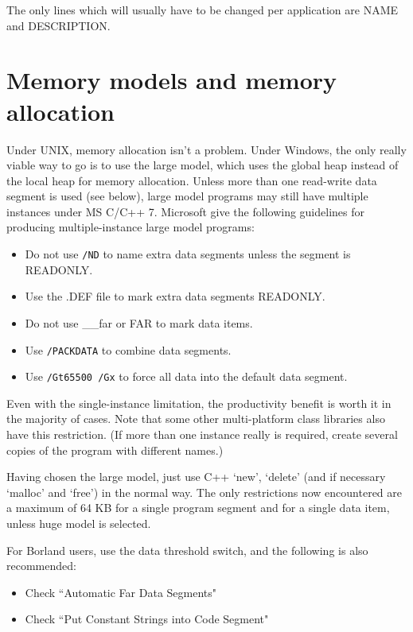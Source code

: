 The only lines which will usually have to be changed per application are
NAME and DESCRIPTION.

\section{Memory models and memory allocation}\label{memorymodels}

Under UNIX, memory allocation isn't a problem. Under Windows, the only
really viable way to go is to use the large model, which uses the global
heap instead of the local heap for memory allocation. Unless more than
one read-write data segment is used (see \rtfsp
below), large model programs may still have multiple instances under MS
C/C++ 7. Microsoft give the following guidelines for producing
multiple-instance large model programs:

\begin{itemize}\itemsep=0pt
\item Do not use {\tt /ND} to name extra data segments unless the segment is READONLY.
\item Use the .DEF file to mark extra data segments READONLY.
\item Do not use \_\_far or FAR to mark data items.
\item Use {\tt /PACKDATA} to combine data segments.
\item Use {\tt /Gt65500 /Gx} to force all data into the default data segment.
\end{itemize}

Even with the single-instance limitation, the productivity benefit is
worth it in the majority of cases. Note that some other multi-platform
class libraries also have this restriction. (If more than one instance
really is required, create several copies of the program with different
names.)

Having chosen the large model, just use C++ `new', `delete' (and if
necessary `malloc' and `free') in the normal way. The only restrictions
now encountered are a maximum of 64 KB for a single program segment and
for a single data item, unless huge model is selected.

For Borland users, use the data threshold switch, and the following is
also recommended:

\begin{itemize}\itemsep=0pt
\item Check ``Automatic Far Data Segments"
\item Check ``Put Constant Strings into Code Segment"
\end{itemize}

